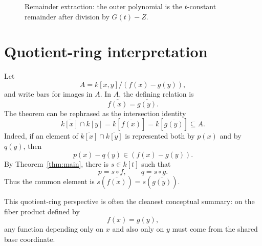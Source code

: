 \documentclass[11pt]{article}
\theoremstyle{plain}
\theoremstyle{definition}
\theoremstyle{remark}
\newcommand{\ol}[1]{\overline{#1}}
\begin{document}
\begin{figure}[h]
\centering
{}
\caption{Remainder extraction: the outer polynomial is the \(t\)-constant remainder after division by \(G(t)-Z\).}
\label{fig:algorithm}
\end{figure}

\section{Quotient-ring interpretation}

Let
\[
    A=k[x,y]/(f(x)-g(y)),
\]
and write bars for images in \(A\). In \(A\), the defining relation is
\[
    \ol{f(x)}=\ol{g(y)}.
\]
The theorem can be rephrased as the intersection identity
\[
    \ol{k[x]}\cap \ol{k[y]}
    =
    k[\ol{f(x)}]
    =
    k[\ol{g(y)}]
    \subseteq A.
\]
Indeed, if an element of \(\ol{k[x]}\cap \ol{k[y]}\) is represented both by \(p(x)\) and by \(q(y)\), then
\[
    p(x)-q(y)\in (f(x)-g(y)).
\]
By Theorem~\ref{thm:main}, there is \(s\in k[t]\) such that
\[
    p=s\circ f,
    \qquad
    q=s\circ g.
\]
Thus the common element is \(s(\ol{f(x)})=s(\ol{g(y)})\).

This quotient-ring perspective is often the cleanest conceptual summary: on the fiber product defined by
\[
    f(x)=g(y),
\]
any function depending only on \(x\) and also only on \(y\) must come from the shared base coordinate.
\end{document}
